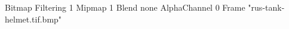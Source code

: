 {Bitmap
	{Filtering 1}
	{Mipmap 1}
	{Blend none}
	{AlphaChannel 0}
	{Frame "rus-tank-helmet.tif.bmp"}
}
